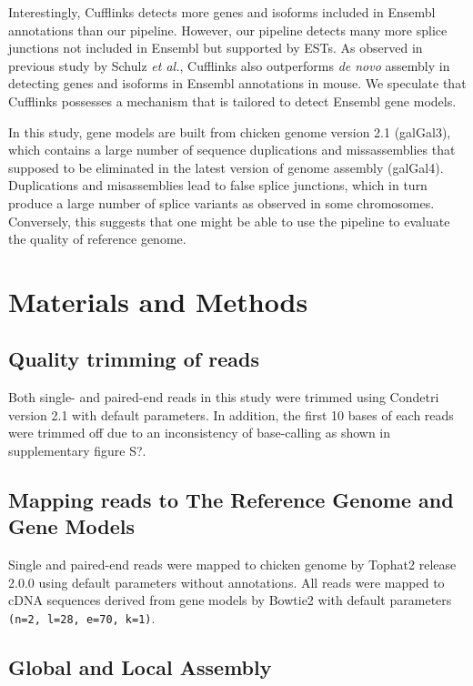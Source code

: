 \documentclass[10pt]{article}
\begin{document}
Interestingly, Cufflinks detects more genes and isoforms included in Ensembl annotations than our pipeline.
However, our pipeline detects many more splice junctions not included in Ensembl but supported by ESTs.
As observed in previous study by Schulz \emph{et al.}\cite{Schulz:2012je}, Cufflinks also outperforms \emph{de novo} assembly in
detecting genes and isoforms in Ensembl annotations in mouse.
We speculate that Cufflinks possesses a mechanism that is tailored to detect Ensembl gene models.

In this study, gene models are built from chicken genome version 2.1 (galGal3), which contains a large number of sequence duplications and
missassemblies that supposed to be eliminated in the latest version of genome assembly (galGal4).
Duplications and misassemblies lead to false splice junctions, which in turn produce a large number of splice variants as
observed in some chromosomes.
Conversely, this suggests that one might be able to use the pipeline to evaluate the quality of reference genome.

\section*{Materials and Methods}

\subsection*{Quality trimming of reads}
Both single- and paired-end reads in this study were trimmed using Condetri version 2.1 with default parameters.
In addition, the first 10 bases of each reads were trimmed off due to an inconsistency of base-calling as shown in supplementary figure S?.

\subsection*{Mapping reads to The Reference Genome and Gene Models}

Single and paired-end reads were mapped to chicken genome by Tophat2\cite{Trapnell:2009dp} release 2.0.0 using
default parameters without annotations.
All reads were mapped to cDNA sequences derived from gene models by Bowtie2\cite{Langmead:2009fv} with
default parameters \texttt{(n=2, l=28, e=70, k=1)}.

\subsection*{Global and Local Assembly}
\end{document}
